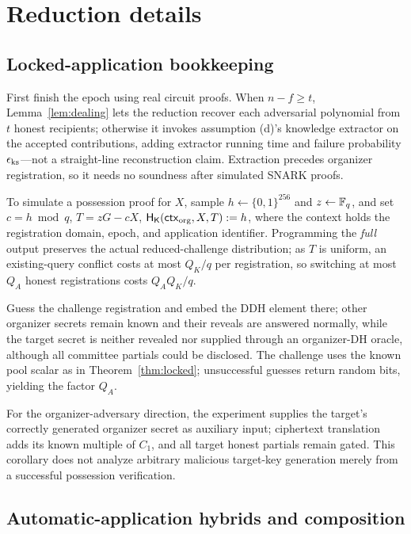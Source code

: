 \section{Reduction details}
\label{app:proofs}

\subsection{Locked-application bookkeeping}
\label{app:locked}

First finish the epoch using real circuit proofs. When $n-f\ge t$, Lemma~\ref{lem:dealing} lets the reduction recover each adversarial polynomial from $t$ honest recipients; otherwise it invokes assumption (d)'s knowledge extractor on the accepted contributions, adding extractor running time and failure probability $\epsilon_{\rm ks}$---not a straight-line reconstruction claim. Extraction precedes organizer registration, so it needs no soundness after simulated SNARK proofs.

To simulate a possession proof for $X$, sample $h\leftarrow\{0,1\}^{256}$ and $z\leftarrow\mathbb{F}_q$, and set $c=h\bmod q$, $T=zG-cX$, $\mathsf{H}_{\mathsf{K}}(\mathsf{ctx}_{\rm org},X,T):=h$, where the context holds the registration domain, epoch, and application identifier. Programming the \emph{full} output preserves the actual reduced-challenge distribution; as $T$ is uniform, an existing-query conflict costs at most $Q_K/q$ per registration, so switching at most $Q_A$ honest registrations costs $Q_AQ_K/q$.

Guess the challenge registration and embed the DDH element there; other organizer secrets remain known and their reveals are answered normally, while the target secret is neither revealed nor supplied through an organizer-DH oracle, although all committee partials could be disclosed. The challenge uses the known pool scalar as in Theorem~\ref{thm:locked}; unsuccessful guesses return random bits, yielding the factor $Q_A$.

For the organizer-adversary direction, the experiment supplies the target's correctly generated organizer secret as auxiliary input; ciphertext translation adds its known multiple of $C_1$, and all target honest partials remain gated. This corollary does not analyze arbitrary malicious target-key generation merely from a successful possession verification.

\subsection{Automatic-application hybrids and composition}
\label{app:automatic}

